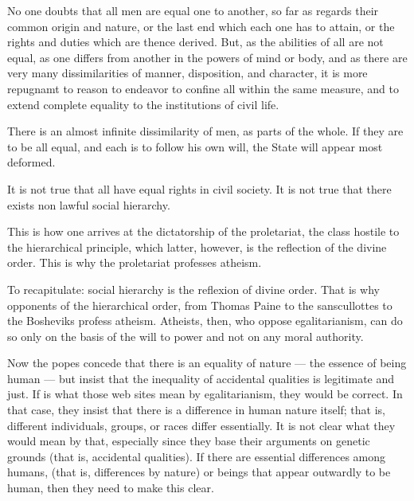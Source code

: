 \begin{quotex}
No one doubts that all men are equal one to another, so far as regards their common origin and nature, or the last end which each one has to attain, or the rights and duties which are thence derived. But, as the abilities of all are not equal, as one differs from another in the powers of mind or body, and as there are very many dissimilarities of manner, disposition, and character, it is more repugnamt to reason to endeavor to confine all within the same measure, and to extend complete equality to the institutions of civil life.

There is an almost infinite dissimilarity of men, as parts of the whole. If they are to be all equal, and each is to follow his own will, the State will appear most deformed.


\end{quotex}


\begin{quotex}
It is not true that all have equal rights in civil society. It is not true that there exists non lawful social hierarchy.


\end{quotex}


\begin{quotex}
This is how one arrives at the dictatorship of the proletariat, the class hostile to the hierarchical principle, which latter, however, is the reflection of the divine order. This is why the proletariat professes atheism.


\end{quotex}


To recapitulate: social hierarchy is the reflexion of divine order. That is why opponents of the hierarchical order, from Thomas Paine to the sanscullottes to the Bosheviks profess atheism. Atheists, then, who oppose egalitarianism, can do so only on the basis of the will to power and not on any moral authority.

Now the popes concede that there is an equality of nature --- the essence of being human --- but insist that the inequality of accidental qualities is legitimate and just. If is what those web sites mean by egalitarianism, they would be correct. In that case, they insist that there is a difference in human nature itself; that is, different individuals, groups, or races differ essentially. It is not clear what they would mean by that, especially since they base their arguments on genetic grounds (that is, accidental qualities). If there are essential differences among humans, (that is, differences by nature) or beings that appear outwardly to be human, then they need to make this clear.


